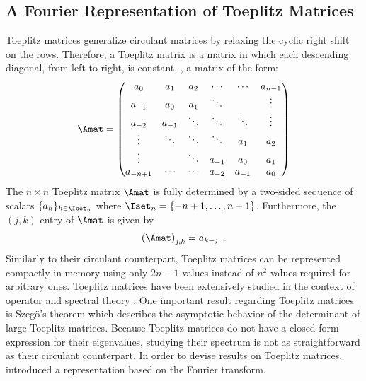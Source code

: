 \subsection{A Fourier Representation of Toeplitz Matrices}
\label{subsection:ch2-a_fourier_representation_of_toeplitz_matrices}

Toeplitz matrices generalize circulant matrices by relaxing the cyclic right shift on the rows.
Therefore, a Toeplitz matrix is a matrix in which each descending diagonal, from left to right, is constant, \ie, a matrix of the form:
\begin{equation}
  \Amat =
  \leftmatrix
    a_0      & a_1    & a_{2}  & \cdots & \cdots & a_{n-1} \\
    a_{-1}   & a_0    & a_{1}  & \ddots &        & \vdots  \\
    a_{-2}   & a_{-1} & \ddots & \ddots & \ddots & \vdots  \\
    \vdots   & \ddots & \ddots & \ddots & a_{1}  & a_2     \\
    \vdots   &        & \ddots & a_{-1} & a_{0}  & a_1     \\
    a_{-n+1} & \cdots & \cdots & a_{-2} & a_{-1} & a_0
  \rightmatrix
\end{equation}
\noindent
The $n \times n$ Toeplitz matrix $\Amat$ is fully determined by a two-sided sequence of scalars $\{a_h\}_{h \in \Iset_n}$ where $\Iset_n = \{-n+1, \dots, n-1\}$.
Furthermore, the $(j,k)$ entry of $\Amat$ is given by
\begin{equation}
  \leftmat \Amat \rightmat_{j,k} = a_{k-j} \enspace.
\end{equation}
\noindent
Similarly to their circulant counterpart, Toeplitz matrices can be represented compactly in memory using only $2n-1$ values instead of $n^2$ values required for arbitrary ones.
Toeplitz matrices have been extensively studied in the context of operator and spectral theory \cite{grenander1958toeplitz,widom1965toeplitz,bottcher2012introduction}.
One important result regarding Toeplitz matrices is Szeg\"{o}'s theorem \cite{szego1915grenzwertsatz} which describes the asymptotic behavior of the determinant of large Toeplitz matrices.
Because Toeplitz matrices do not have a closed-form expression for their eigenvalues, studying their spectrum is not as straightforward as their circulant counterpart.
In order to devise results on Toeplitz matrices, \citet{grenander1958toeplitz} introduced a representation based on the Fourier transform.
